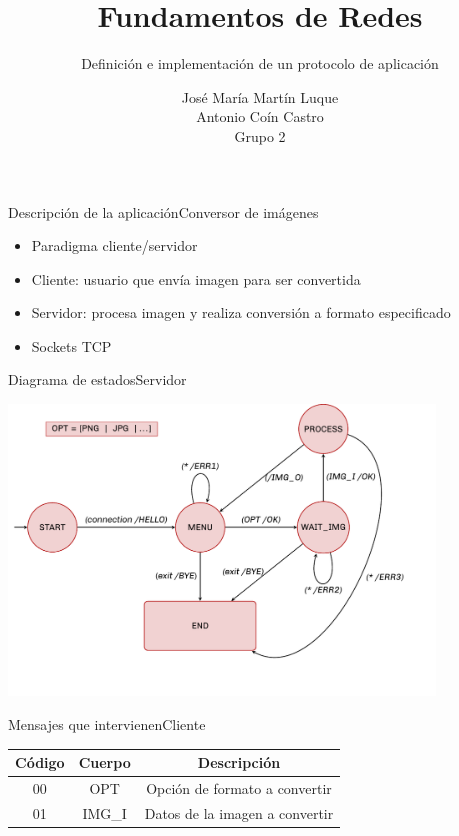\documentclass[spanish]{beamer}
\title{Fundamentos de Redes}
\subtitle{Definición e implementación de un protocolo de aplicación}
\author{José María Martín Luque\\ Antonio Coín Castro\\ \vspace{1em}Grupo 2}
\begin{document}
\maketitle

\begin{frame}{Descripción de la aplicación}{Conversor de imágenes}

\begin{itemize}
	\item Paradigma cliente/servidor
    \item Cliente: usuario que envía imagen para ser convertida 
	\item Servidor: procesa imagen y realiza conversión a formato especificado
	\item Sockets TCP
\end{itemize}
\end{frame}

\begin{frame}{Diagrama de estados}{Servidor}
\begin{center}
	\includegraphics[width=0.85\textwidth]{img/diagrama}
\end{center}	
\end{frame}

\begin{frame}{Mensajes que intervienen}{Cliente}
\begin{center}
	\begin{tabular}{|c|c|c|}
	\hline
	Código & Cuerpo & Descripción\\
	\hline
	00 & OPT & Opción de formato a convertir\\
	\hline
	01 & IMG\_I & Datos de la imagen a convertir\\
	\hline
\end{tabular}
\end{center}
\end{frame}
\end{document}
